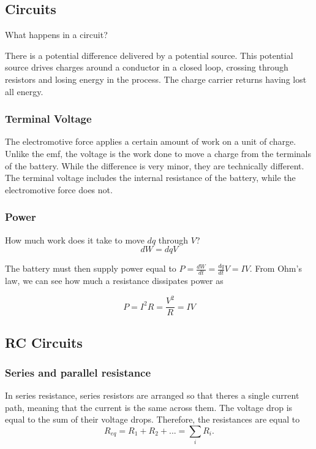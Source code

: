 \documentclass{article}
\begin{document}
\subsection{Circuits}

What happens in a circuit?

There is a potential difference delivered by a potential source. This potential source drives charges around a conductor in a closed loop, crossing through resistors and
losing energy in the process. The charge carrier returns having lost all energy.

\subsubsection{Terminal Voltage}

The electromotive force applies a certain amount of work on a unit of charge. Unlike the emf, the voltage is the work done to move a charge from the terminals of the 
battery. While the difference is very minor, they are technically different. The terminal voltage includes the internal resistance of the battery, while the electromotive 
force does not.

\subsubsection{Power}

How much work does it take to move $dq$ through $V$?
$$ dW= dq V $$

The battery must then supply power equal to $P=\frac{dW}{dt}=\frac{dq}{dt}V=IV$. From Ohm's law, we can see how much a resistance dissipates power as

\begin{equation} P=I^2R=\frac{V^2}{R}=IV \end{equation}

\subsection{RC Circuits}

\subsubsection{Series and parallel resistance}

In series resistance, series resistors are arranged so that theres a single current path, meaning that the current is the same across them. The voltage drop is equal to 
the sum of their voltage drops. Therefore, the resistances are equal to $$R_{eq}=R_1+R_2+...=\sum_i{R_i}.$$
\end{document}
